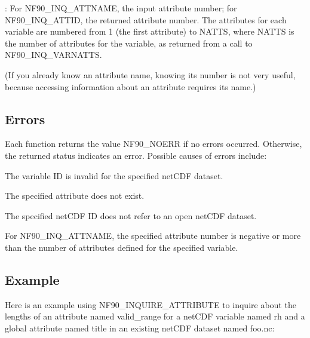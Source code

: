 \+: For N\+F90\+\_\+\+I\+N\+Q\+\_\+\+A\+T\+T\+N\+A\+ME, the input attribute number; for N\+F90\+\_\+\+I\+N\+Q\+\_\+\+A\+T\+T\+ID, the returned attribute number. The attributes for each variable are numbered from 1 (the first attribute) to N\+A\+T\+TS, where N\+A\+T\+TS is the number of attributes for the variable, as returned from a call to N\+F90\+\_\+\+I\+N\+Q\+\_\+\+V\+A\+R\+N\+A\+T\+TS.

(If you already know an attribute name, knowing its number is not very useful, because accessing information about an attribute requires its name.)

\subsection*{Errors}

Each function returns the value N\+F90\+\_\+\+N\+O\+E\+RR if no errors occurred. Otherwise, the returned status indicates an error. Possible causes of errors include\+:


\begin{DoxyItemize}
\item The variable ID is invalid for the specified net\+C\+DF dataset.
\item The specified attribute does not exist.
\item The specified net\+C\+DF ID does not refer to an open net\+C\+DF dataset.
\item For N\+F90\+\_\+\+I\+N\+Q\+\_\+\+A\+T\+T\+N\+A\+ME, the specified attribute number is negative or more than the number of attributes defined for the specified variable.
\end{DoxyItemize}

\subsection*{Example}

Here is an example using N\+F90\+\_\+\+I\+N\+Q\+U\+I\+R\+E\+\_\+\+A\+T\+T\+R\+I\+B\+U\+TE to inquire about the lengths of an attribute named valid\+\_\+range for a net\+C\+DF variable named rh and a global attribute named title in an existing net\+C\+DF dataset named foo.\+nc\+:


